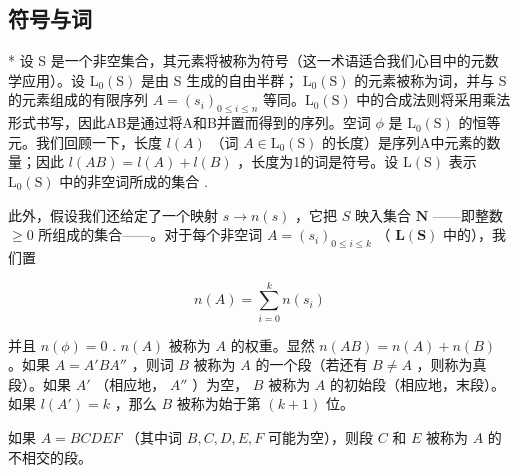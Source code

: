 \subsection{符号与词}

* 设 S 是一个非空集合，其元素将被称为符号（这一术语适合我们心目中的元数学应用）。设 \(\mathrm{L}_{0}(\mathrm{S})\) 是由 S 生成的自由半群； \(\mathrm{L}_{0}(\mathrm{S})\) 的元素被称为词，并与 S 的元素组成的有限序列 \(A = (s_{i})_{0 \leqslant i \leqslant n}\) 等同。\(\mathrm{L}_{0}(\mathrm{S})\) 中的合成法则将采用乘法形式书写，因此AB是通过将A和B并置而得到的序列。空词 \(\phi\) 是 \(\mathrm{L}_{0}(\mathrm{S})\) 的恒等元。我们回顾一下，长度 \(l(A)\) （词 \(A \in \mathrm{L}_{0}(\mathrm{S})\) 的长度）是序列A中元素的数量；因此 \(l(AB) = l(A) + l(B)\) ，长度为1的词是符号。设 \(\mathrm{L}(\mathrm{S})\) 表示 \(\mathrm{L}_{0}(\mathrm{S})\) 中的非空词所成的集合 .

此外，假设我们还给定了一个映射 \(s \to n(s)\) ，它把 \(S\) 映入集合 \(\mathbf{N}\) ——即整数 \(\geqslant 0\) 所组成的集合——。对于每个非空词 \(A = (s_i)_{0 \leqslant i \leqslant k}\) （ \(\mathbf{L}(\mathbf{S})\) 中的），我们置

\[
n (A) = \sum_ {i = 0} ^ {k} n (s _ {i})
\]

并且 \(n(\phi) = 0\) . \(n(A)\) 被称为 \(A\) 的权重。显然 \(n(AB) = n(A) + n(B)\) 。如果 \(A = A'BA''\) ，则词 \(B\) 被称为 \(A\) 的一个段（若还有 \(B \neq A\) ，则称为真段）。如果 \(A'\) （相应地， \(A''\) ）为空， \(B\) 被称为 \(A\) 的初始段（相应地，末段）。如果 \(l(A') = k\) ，那么 \(B\) 被称为始于第 \((k + 1)\) 位。

如果 \(A = BCDEF\) （其中词 \(B, C, D, E, F\) 可能为空），则段 \(C\) 和 \(E\) 被称为 \(A\) 的不相交的段。

